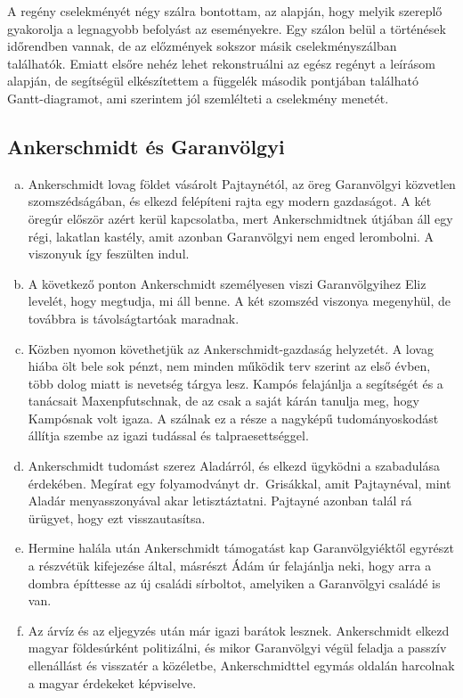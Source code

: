 \documentclass{thesis-ekf}
\begin{document}
    A regény cselekményét négy szálra bontottam, az alapján, hogy melyik szereplő gyakorolja a legnagyobb befolyást az eseményekre.
    Egy szálon belül a történések időrendben vannak, de az előzmények sokszor másik cselekményszálban találhatók.
    Emiatt elsőre nehéz lehet rekonstruálni az egész regényt a leírásom alapján, de segítségül elkészítettem
        a függelék második pontjában található Gantt-diagramot, ami szerintem jól szemlélteti a cselekmény menetét.

    \subsection{Ankerschmidt és Garanvölgyi}

    \begin{enumerate}[a)]
        \item\label{itm:bekoltoznek} Ankerschmidt lovag földet vásárolt Pajtaynétól, az öreg Garanvölgyi közvetlen szomszédságában,
            és elkezd felépíteni rajta egy modern gazdaságot.
        A két öregúr először azért kerül kapcsolatba, mert Ankerschmidtnek útjában áll egy régi, lakatlan kastély,
            amit azonban Garanvölgyi nem enged lerombolni.
        A viszonyuk így feszülten indul.
        \item\label{itm:Eliz-levele} A következő ponton Ankerschmidt személyesen viszi Garanvölgyihez Eliz levelét, hogy megtudja, mi áll benne.
        A két szomszéd viszonya megenyhül, de továbbra is távolságtartóak maradnak.
        \item\label{itm:gazdasag} Közben nyomon követhetjük az Ankerschmidt-gazdaság helyzetét.
        A lovag hiába ölt bele sok pénzt, nem minden működik terv szerint az első évben, több dolog miatt is nevetség tárgya lesz.
        Kampós felajánlja a segítségét és a tanácsait Maxenpfutschnak, de az csak a saját kárán tanulja meg, 
            hogy Kampósnak volt igaza.
        A szálnak ez a része a nagyképű tudományoskodást állítja szembe az igazi tudással és talpraesettséggel.
        \item\label{itm:Aladarert} Ankerschmidt tudomást szerez Aladárról, és elkezd ügyködni a szabadulása érdekében.
        Megírat egy folyamodványt dr.~Grisákkal, amit Pajtaynéval, mint Aladár menyasszonyával akar letisztáztatni.
        Pajtayné azonban talál rá ürügyet, hogy ezt visszautasítsa.
        \item\label{itm:sirbolt} Hermine halála után Ankerschmidt támogatást kap Garanvölgyiéktől egyrészt a részvétük kifejezése által,
            másrészt Ádám úr felajánlja neki, hogy arra a dombra építtesse az új családi sírboltot, 
            amelyiken a Garanvölgyi családé is van.
        \item\label{itm:politika} Az árvíz és az eljegyzés után már igazi barátok lesznek.
        Ankerschmidt elkezd magyar földesúrként politizálni, és mikor Garanvölgyi végül feladja a passzív ellenállást 
            és visszatér a közéletbe, Ankerschmidttel egymás oldalán harcolnak a magyar érdekeket képviselve.
    \end{enumerate}
    
\end{document}
